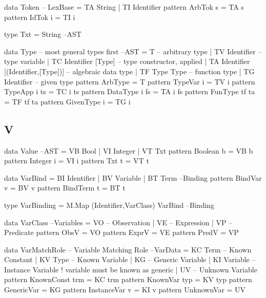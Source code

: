\begin{code}
data Token                                                         -- LexBase
 = TA String
 | TI Identifier
pattern ArbTok s = TA s
pattern IdTok i = TI i
\end{code}

\begin{code}
type Txt = String                                                        --AST
\end{code}


\begin{code}
data Type -- most general types first                                   --AST
 = T  -- arbitrary type
 | TV Identifier -- type variable
 | TC Identifier [Type] -- type constructor, applied
 | TA Identifier [(Identifier,[Type])] -- algebraic data type
 | TF Type Type -- function type
 | TG Identifier -- given type
pattern ArbType = T
pattern TypeVar i  = TV i
pattern TypeApp i ts = TC i ts
pattern DataType i fs = TA i fs
pattern FunType tf ta = TF tf ta
pattern GivenType i = TG i
\end{code}


\subsection{V}

\begin{code}
data Value                                                               --AST
 = VB Bool
 | VI Integer
 | VT Txt
pattern Boolean b  =  VB b
pattern Integer i  =  VI i
pattern Txt     t  =  VT t
\end{code}

\begin{code}
data VarBind = BI Identifier | BV Variable | BT Term                 --Binding
pattern BindVar  v  =  BV v
pattern BindTerm t  =  BT t
\end{code}

\begin{code}
type VarBinding = M.Map (Identifier,VarClass) VarBind                --Binding
\end{code}

\begin{code}
data VarClass                                                     --Variables
  = VO -- Observation
  | VE -- Expression
  | VP -- Predicate
pattern ObsV  = VO
pattern ExprV = VE
pattern PredV = VP
\end{code}

\begin{code}
data VarMatchRole -- Variable Matching Role                          --VarData
  =  KC Term     -- Known Constant
  |  KV Type     -- Known Variable
  |  KG          -- Generic Variable
  |  KI Variable -- Instance Variable ! variable must be known as generic
  |  UV          -- Unknown Variable
pattern KnownConst trm = KC trm
pattern KnownVar typ   = KV typ
pattern GenericVar     = KG
pattern InstanceVar v  = KI v
pattern UnknownVar     = UV
\end{code}


